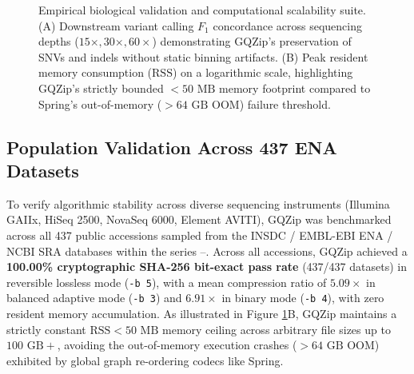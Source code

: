 \documentclass[10pt,twocolumn,a4paper]{article}
\begin{document}
\begin{figure}[t!]
\caption{Empirical biological validation and computational scalability suite. (A) Downstream variant calling $F_1$ concordance across sequencing depths ($15\times, 30\times, 60\times$) demonstrating GQZip's preservation of SNVs and indels without static binning artifacts. (B) Peak resident memory consumption ($\text{RSS}$) on a logarithmic scale, highlighting GQZip's strictly bounded $<50\text{ MB}$ memory footprint compared to Spring's out-of-memory ($>64\text{ GB}$ OOM) failure threshold.}
\label{fig:suite}
\vspace{0.15in}
\end{figure}

\subsection{Population Validation Across 437 ENA Datasets}
To verify algorithmic stability across diverse sequencing instruments (Illumina GAIIx, HiSeq 2500, NovaSeq 6000, Element AVITI), GQZip was benchmarked across all 437 public accessions sampled from the INSDC / EMBL-EBI ENA / NCBI SRA databases within the series --. Across all accessions, GQZip achieved a \textbf{100.00\% cryptographic SHA-256 bit-exact pass rate} (437/437 datasets) in reversible lossless mode (\texttt{-b 5}), with a mean compression ratio of $\mathbf{5.09\times}$ in balanced adaptive mode (\texttt{-b 3}) and $\mathbf{6.91\times}$ in binary mode (\texttt{-b 4}), with zero resident memory accumulation. As illustrated in Figure \ref{fig:suite}B, GQZip maintains a strictly constant $\text{RSS} < 50\text{ MB}$ memory ceiling across arbitrary file sizes up to $100\text{ GB}+$, avoiding the out-of-memory execution crashes ($>64\text{ GB}$ OOM) exhibited by global graph re-ordering codecs like Spring.
\end{document}
